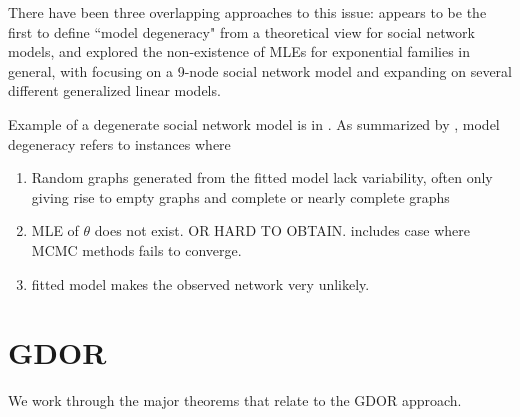 \documentclass{amsbook}
\theoremstyle{definition}
\theoremstyle{remark}
\begin{document}
There have been three overlapping approaches to this issue: \citet{Handcock:Degeneracy} appears to be the first to define ``model degeneracy" from a theoretical view for social network models, \citet{Rinaldo:2009} and \citet{Geyer:gdor} explored the non-existence of MLEs for exponential families in general, with \citet{Rinaldo:2009} focusing on a 9-node social network model and \citet{Geyer:gdor} expanding on several different generalized linear models.

Example of a degenerate social network model is in \citet{statnet-tutorial}.  As summarized by \citet{Rinaldo:2009}, model degeneracy refers to instances where

\begin{enumerate}
\item Random graphs generated from the fitted model lack variability, often only 
giving rise to empty graphs and complete or nearly complete graphs
\item MLE of $\theta$ does not exist.  OR HARD TO OBTAIN.  includes case where MCMC 
methods fails to converge.
\item fitted model makes the observed network very unlikely.
\end{enumerate}

\newpage
\section{GDOR}
We work through the major theorems that relate to the GDOR approach.
\end{document}
